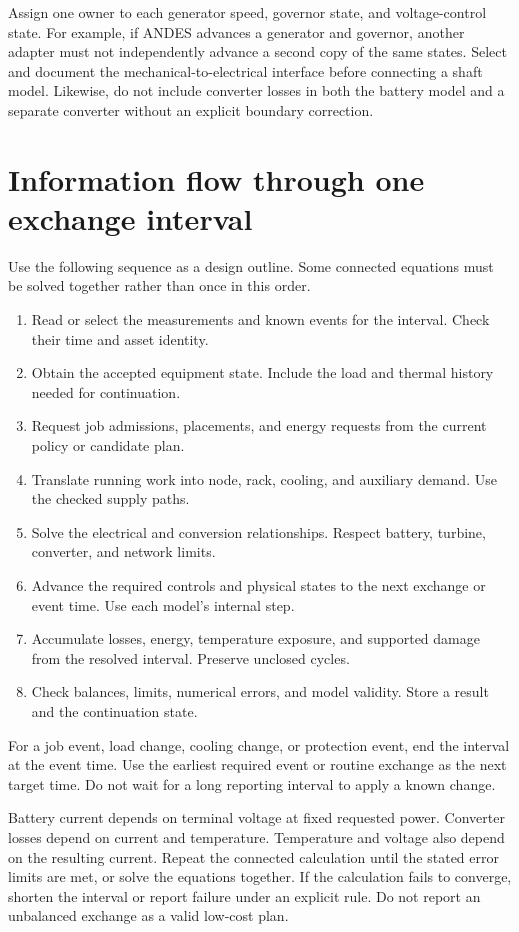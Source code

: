 \documentclass[11pt,a4paper]{report}
\begin{document}
Assign one owner to each generator speed, governor state, and voltage-control state.
For example, if ANDES advances a generator and governor, another adapter must not independently advance a second copy of the same states.
Select and document the mechanical-to-electrical interface before connecting a shaft model.
Likewise, do not include converter losses in both the battery model and a separate converter without an explicit boundary correction.

\section{Information flow through one exchange interval}
Use the following sequence as a design outline.
Some connected equations must be solved together rather than once in this order.
\begin{enumerate}
\item Read or select the measurements and known events for the interval. Check their time and asset identity.
\item Obtain the accepted equipment state. Include the load and thermal history needed for continuation.
\item Request job admissions, placements, and energy requests from the current policy or candidate plan.
\item Translate running work into node, rack, cooling, and auxiliary demand. Use the checked supply paths.
\item Solve the electrical and conversion relationships. Respect battery, turbine, converter, and network limits.
\item Advance the required controls and physical states to the next exchange or event time. Use each model's internal step.
\item Accumulate losses, energy, temperature exposure, and supported damage from the resolved interval. Preserve unclosed cycles.
\item Check balances, limits, numerical errors, and model validity. Store a result and the continuation state.
\end{enumerate}

For a job event, load change, cooling change, or protection event, end the interval at the event time.
Use the earliest required event or routine exchange as the next target time.
Do not wait for a long reporting interval to apply a known change.

Battery current depends on terminal voltage at fixed requested power.
Converter losses depend on current and temperature.
Temperature and voltage also depend on the resulting current.
Repeat the connected calculation until the stated error limits are met, or solve the equations together.
If the calculation fails to converge, shorten the interval or report failure under an explicit rule.
Do not report an unbalanced exchange as a valid low-cost plan.
\end{document}
